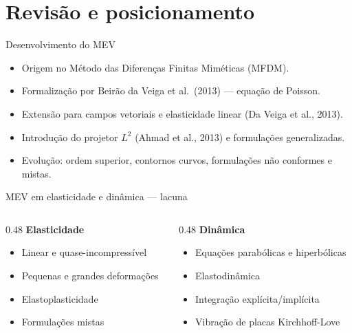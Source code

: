 \documentclass[aspectratio=169]{beamer}
\begin{document}
{%
\section{Revisão e posicionamento}

\begin{frame}{Desenvolvimento do MEV}
  \begin{itemize}
    \item Origem no Método das Diferenças Finitas Miméticas (MFDM).
    \item Formalização por Beirão da Veiga et al.\ (2013) --- equação de Poisson.
    \item Extensão para campos vetoriais e elasticidade linear (Da Veiga et al., 2013).
    \item Introdução do projetor $L^2$ (Ahmad et al., 2013) e formulações generalizadas.
    \item Evolução: ordem superior, contornos curvos, formulações não conformes e mistas.
  \end{itemize}
\end{frame}

\begin{frame}{MEV em elasticidade e dinâmica --- lacuna}
  \begin{columns}[T]
    \begin{column}{0.48\textwidth}
      \textbf{Elasticidade}
      \begin{itemize}
        \item Linear e quase-incompressível
        \item Pequenas e grandes deformações
        \item Elastoplasticidade
        \item Formulações mistas
      \end{itemize}
    \end{column}
    \begin{column}{0.48\textwidth}
      \textbf{Dinâmica}
      \begin{itemize}
        \item Equações parabólicas e hiperbólicas
        \item Elastodinâmica
        \item Integração explícita/implícita
        \item Vibração de placas Kirchhoff-Love
      \end{itemize}
    \end{column}
  \end{columns}


\end{frame}}
\end{document}
